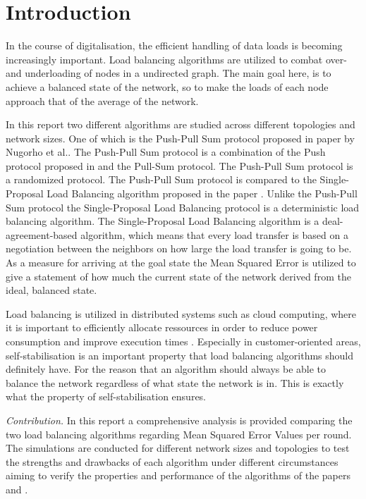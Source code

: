 \chapter{Introduction}\label{chap:introduction}
In the course of digitalisation, the efficient handling of data loads is becoming increasingly important. Load balancing algorithms are utilized to combat over- and underloading of nodes in a undirected graph. The main goal here, is to achieve a balanced state of the network, so to make the loads of each node approach that of the average of the network. 

In this report two different algorithms are studied across different topologies and network sizes. One of which is the Push-Pull Sum protocol proposed in paper \cite{nugroho2023PushPullSumDataAg} by Nugorho et al.. The Push-Pull Sum protocol is a combination of the Push protocol proposed in \cite{kempe2003gossipbasedComp} and the Pull-Sum protocol. The Push-Pull Sum protocol is a randomized protocol. The Push-Pull Sum protocol is compared to the Single-Proposal Load Balancing algorithm proposed in the paper \cite{dinitz2022localDealAgreementloadBalancing}. Unlike the Push-Pull Sum protocol the Single-Proposal Load Balancing protocol is a deterministic load balancing algorithm. The Single-Proposal Load Balancing algorithm is a deal-agreement-based algorithm, which means that every load transfer is based on a negotiation between the neighbors on how large the load transfer is going to be. As a measure for arriving at the goal state the Mean Squared Error is utilized to give a statement of how much the current state of the network derived from the ideal, balanced state.

Load balancing is utilized in distributed systems such as cloud computing, where it is important to efficiently allocate ressources in order to reduce power consumption and improve execution times \cite{Aghdashi2022NovelDynamicLoadBalancing}. Especially in customer-oriented areas, self-stabilisation is an important property that load balancing algorithms should definitely have. For the reason that an algorithm should always be able to balance the network regardless of what state the network is in. This is exactly what the property of self-stabilisation ensures.

\textit{Contribution.} In this report a comprehensive analysis is provided comparing the two load balancing algorithms regarding Mean Squared Error Values per round. The simulations are conducted for different network sizes and topologies to test the strengths and drawbacks of each algorithm under different circumstances aiming to verify the properties and performance of the algorithms of the papers \cite{nugroho2023PushPullSumDataAg} and \cite{dinitz2022localDealAgreementloadBalancing}. 

